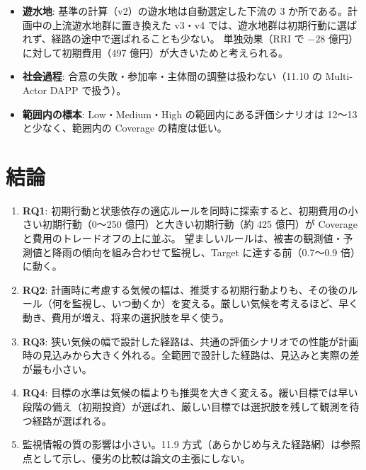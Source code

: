 \documentclass[a4paper,10pt]{ltjsarticle}
\begin{document}
\begin{itemize}
    森林化の効果は効果係数に対して単調でない（係数 0.5 の方が効果の大きい地域がある）。畑の浸透量の上限 $F_{\max}=0.3$ m と新規森林の土壌貯留 $0.4D$ の大小が係数によって入れ替わるためと考えられる。
  \item \textbf{遊水地}: 基準の計算（v2）の遊水地は自動選定した下流の 3 か所である。計画中の上流遊水地群に置き換えた v3・v4 では、遊水地群は初期行動に選ばれず、経路の途中で選ばれることも少ない。
    単独効果（RRI で $-28$ 億円）に対して初期費用（497 億円）が大きいためと考えられる。
  \item \textbf{社会過程}: 合意の失敗・参加率・主体間の調整は扱わない（11.10 の Multi-Actor DAPP で扱う）。
  \item \textbf{範囲内の標本}: Low・Medium・High の範囲内にある評価シナリオは 12〜13 と少なく、範囲内の Coverage の精度は低い。
\end{itemize}

\section{結論}
\label{sec:conclusion}
\begin{enumerate}
  \item \textbf{RQ1}: 初期行動と状態依存の適応ルールを同時に探索すると、初期費用の小さい初期行動（0〜250 億円）と大きい初期行動（約 425 億円）が Coverage と費用のトレードオフの上に並ぶ。
    望ましいルールは、被害の観測値・予測値と降雨の傾向を組み合わせて監視し、Target に達する前（0.7〜0.9 倍）に動く。
  \item \textbf{RQ2}: 計画時に考慮する気候の幅は、推奨する初期行動よりも、その後のルール（何を監視し、いつ動くか）を変える。厳しい気候を考えるほど、早く動き、費用が増え、将来の選択肢を早く使う。
  \item \textbf{RQ3}: 狭い気候の幅で設計した経路は、共通の評価シナリオでの性能が計画時の見込みから大きく外れる。全範囲で設計した経路は、見込みと実際の差が最も小さい。
  \item \textbf{RQ4}: 目標の水準は気候の幅よりも推奨を大きく変える。緩い目標では早い段階の備え（初期投資）が選ばれ、厳しい目標では選択肢を残して観測を待つ経路が選ばれる。
  \item 監視情報の質の影響は小さい。11.9 方式（あらかじめ与えた経路網）は参照点として示し、優劣の比較は論文の主張にしない。
\end{enumerate}

\end{document}
